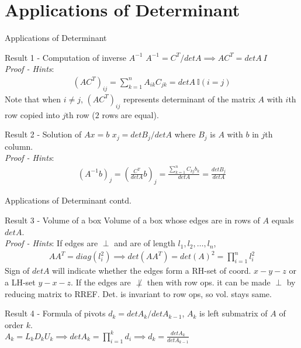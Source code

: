 \documentclass{beamer}
\begin{document}
\section{Applications of Determinant}
\begin{frame}{Applications of Determinant}
\begin{block}{Result 1 - Computation of inverse $A^{-1}$}
$A^{-1} = C^T/detA \implies AC^{T} = detA\ I$\\
\textit{Proof - Hints}:
\begin{align*}
    (AC^{T})_{ij} = \sum_{k=1}^{n}A_{ik}C_{jk} = detA\ \mathbb{I}(i=j) 
\end{align*}
Note that when $i \neq j$, $(AC^T)_{ij}$ represents determinant of the matrix $A$ with $i$th row copied into $j$th row ($2$ rows are equal).
\end{block}
\begin{block}{Result 2 - Solution of $Ax=b$}
$x_{j} = detB_j/detA$ where $B_j$ is $A$ with $b$ in $j$th column.\\
\textit{Proof - Hints}:
\begin{align*}
    (A^{-1}b)_j = \left(\frac{C^T}{detA}b\right)_j = \frac{\sum_{k=1}^{n}C_{kj}b_k}{detA} = \frac{detB_j}{detA}
\end{align*}
\end{block}
\end{frame}

\begin{frame}{Applications of Determinant contd.}
\begin{block}{Result 3 - Volume of a box}
Volume of a box whose edges are in rows of $A$ equals $detA$.\\
\textit{Proof - Hints}: If edges are $\perp$ and are of length $l_1, l_2, \ldots, l_n$,
\begin{align*}
    AA^T = diag(l_i^2) \implies det(AA^T) = det(A)^2 = \prod_{i=1}^{n}l_i^2
\end{align*}
Sign of $detA$ will indicate whether the edges form a RH-set of coord.  $x-y-z$ or a LH-set $y-x-z$. If the edges are $\not\perp$ then with row ops. it can be made $\perp$ by reducing  matrix to  RREF. Det. is invariant to row ops, so vol. stays same.
\end{block}
\begin{block}{Result 4 - Formula of pivots}
$d_{k} = detA_k/detA_{k-1}$, $A_k$ is left submatrix of $A$ of order $k$.\\
$A_k = L_kD_kU_k \implies detA_k = \prod_{i=1}^{k}d_i \implies d_k = \frac{detA_k}{detA_{k-1}}$
\end{block}
\end{frame}
\end{document}
